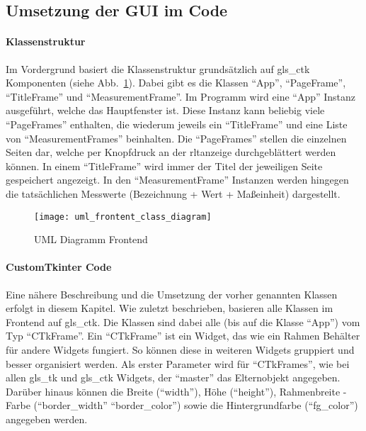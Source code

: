 \subsection{Umsetzung der GUI im Code}\label{tkintercode}
\paragraph{Klassenstruktur}
Im Vordergrund basiert die Klassenstruktur grundsätzlich auf \gls{gls_ctk} Komponenten (siehe Abb.~\ref{fig:klassenstruktur_frontend}). Dabei gibt es die Klassen \enquote{App}, \enquote{PageFrame}, \enquote{TitleFrame} und \enquote{MeasurementFrame}. Im Programm wird eine \enquote{App} Instanz ausgeführt, welche das Hauptfenster ist. Diese Instanz kann beliebig viele \enquote{PageFrames} enthalten, die wiederum jeweils ein \enquote{TitleFrame} und eine Liste von \enquote{MeasurementFrames} beinhalten. Die \enquote{PageFrames} stellen die einzelnen Seiten dar, welche per Knopfdruck an der \acs{rltanzeige} durchgeblättert werden können. In einem \enquote{TitleFrame} wird immer der Titel der jeweiligen Seite gespeichert \bzw angezeigt. In den \enquote{MeasurementFrame} Instanzen werden hingegen die tatsächlichen Messwerte (Bezeichnung + Wert + Maßeinheit) dargestellt.

\begin{figure}[H]
	\centering
	\texttt{[image: uml\_frontent\_class\_diagram]}
	\caption{UML Diagramm Frontend \label{fig:klassenstruktur_frontend}}
\end{figure}

\paragraph{CustomTkinter Code}
Eine nähere Beschreibung und die Umsetzung der vorher genannten Klassen erfolgt in diesem Kapitel. 
\newline Wie zuletzt beschrieben, basieren alle Klassen im Frontend auf \gls{gls_ctk}. Die Klassen sind dabei alle (bis auf die Klasse \enquote{App}) vom Typ \enquote{CTkFrame}. Ein \enquote{CTkFrame} ist ein Widget, das wie ein Rahmen \bzw Behälter für andere Widgets fungiert. So können diese in weiteren Widgets gruppiert und besser organisiert werden. Als erster Parameter wird für \enquote{CTkFrames}, wie bei allen \gls{gls_tk} und \gls{gls_ctk} Widgets, der \enquote{master} \bzw das Elternobjekt angegeben. Darüber hinaus können die Breite (\enquote{width}), Höhe (\enquote{height}), Rahmenbreite \bzw -Farbe (\enquote{border\_width} \bzw \enquote{border\_color}) sowie die Hintergrundfarbe (\enquote{fg\_color}) angegeben werden. \cite[vgl.][]{Schimansky:o.J.}

